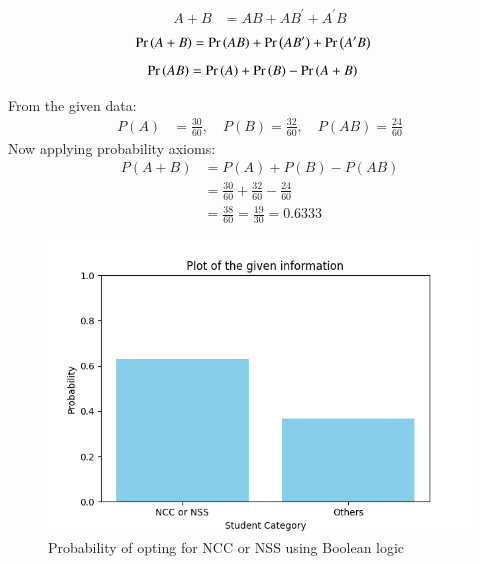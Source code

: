 \documentclass[journal]{IEEEtran}
\begin{document}
     \begin{align}
	 A + B &= AB + AB^\prime + A^\prime B 
     \end{align}
     \begin{align}
	 \Pr\left(A + B\right) &= \Pr\left(AB\right) + \Pr\left(AB^\prime\right) + \Pr\left(A^\prime B\right) 
     \end{align}
	\begin{align}
	 \Pr\left(AB\right) &= \Pr\left(A\right) + \Pr\left(B\right) - \Pr\left(A + B\right) 
     \end{align}

From the given data:
\begin{align}
    P(A) &= \frac{30}{60}, \quad
    P(B) = \frac{32}{60}, \quad
    P(AB) = \frac{24}{60}
\end{align}
Now applying probability axioms:
\begin{align}
    P(A + B) &= P(A) +  P(B) - P(A B) \\
              &= \frac{30}{60} + \frac{32}{60} - \frac{24}{60} \\
              &= \frac{38}{60} = \frac{19}{30} = 0.6333
\end{align}

\begin{figure}[h]
    \centering
    \includegraphics[width=\columnwidth]{figs/fig.png}
    \caption{Probability of opting for NCC or NSS using Boolean logic}
    \label{fig:Plot}
\end{figure}
\end{document}
